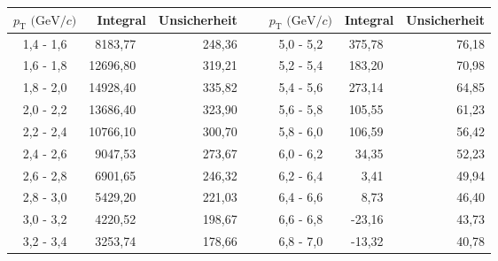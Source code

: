 \begin{table}[h]
	\centering

\begin{tabular}{ | c || r | r ||  l  || c || r | r | }
		\hline
		$p_\text{T} \text{ (GeV}/c)$ & Integral & Unsicherheit & \ & $p_\text{T} \text{ (GeV}/c)$ & Integral & Unsicherheit \\ \hline
		1,4 - 1,6 & 8183,77 \  & 248,36 \hspace{3mm}  & \ &  5,0 - 5,2 & 375,78 \ & 76,18 \hspace{3mm} \\ \hline
		1,6 - 1,8 & 12696,80 \ & 319,21 \hspace{3mm} & \ &  5,2 - 5,4 & 183,20 \ & 70,98 \hspace{3mm} \\ \hline
		1,8 - 2,0 & 14928,40 \ & 335,82 \hspace{3mm} & \ &  5,4 - 5,6 & 273,14 \ & 64,85 \hspace{3mm} \\ \hline
		2,0 - 2,2 & 13686,40 \ & 323,90 \hspace{3mm} & \ &  5,6 - 5,8 & 105,55 \ & 61,23 \hspace{3mm} \\ \hline
		2,2 - 2,4 & 10766,10 \ & 300,70 \hspace{3mm} & \ &  5,8 - 6,0 & 106,59 \ & 56,42 \hspace{3mm} \\ \hline
		2,4 - 2,6 & 9047,53 \  & 273,67 \hspace{3mm} & \ &  6,0 - 6,2 & 34,35 \  & 52,23 \hspace{3mm} \\ \hline
		2,6 - 2,8 & 6901,65 \  & 246,32 \hspace{3mm} & \ &  6,2 - 6,4 & 3,41 \   & 49,94 \hspace{3mm} \\ \hline
		2,8 - 3,0 & 5429,20 \  & 221,03 \hspace{3mm} & \ &  6,4 - 6,6 & 8,73 \   & 46,40 \hspace{3mm} \\ \hline
		3,0 - 3,2 & 4220,52 \  & 198,67 \hspace{3mm} & \ &  6,6 - 6,8 & -23,16 \ & 43,73 \hspace{3mm} \\ \hline
		3,2 - 3,4 & 3253,74 \ & 178,66 \hspace{3mm} & \ &  6,8 - 7,0 & -13,32 \ & 40,78 \hspace{3mm} \\ \hline

\end{tabular}
\end{table}
